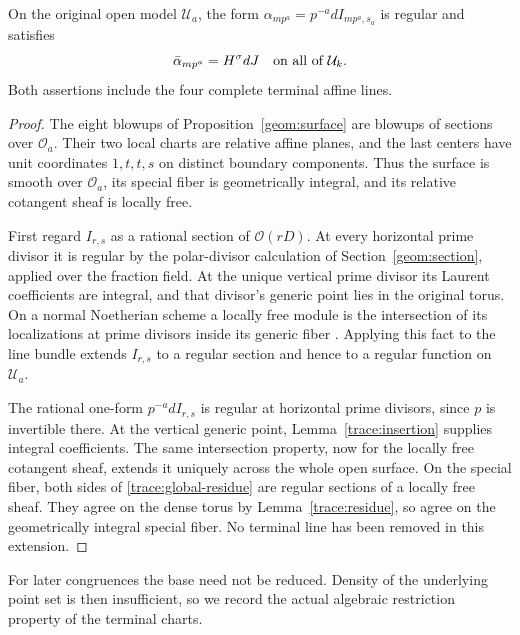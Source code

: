 \begin{proposition}
\label{trace:regular}
On the original open model $\mathcal U_a$, the form
$\alpha_{mp^a}=p^{-a}dI_{mp^a,s_a}$ is regular and satisfies
\begin{equation}
 \bar\alpha_{mp^a}=H^\sigma dJ
 \quad\hbox{on all of }\mathcal U_k.
 \label{trace:global-residue}
\end{equation}
Both assertions include the four complete terminal affine lines.
\end{proposition}

\begin{proof}
The eight blowups of Proposition~\ref{geom:surface} are blowups of sections
over $\mathcal O_a$. Their two local charts are relative affine planes,
and the last centers have unit coordinates $1,t,t,s$ on distinct
boundary components. Thus the surface is smooth over $\mathcal O_a$,
its special fiber is geometrically integral, and its relative cotangent
sheaf is locally free.

First regard $I_{r,s}$ as a rational section of $\mathcal O(rD)$.
At every horizontal prime divisor it is regular by the polar-divisor
calculation of Section~\ref{geom:section}, applied over the fraction field.
At the unique vertical prime divisor its Laurent coefficients are integral,
and that divisor's generic point lies in the original torus.
On a normal Noetherian scheme a locally free module is the intersection
of its localizations at prime divisors inside its generic fiber
\cite[Tag 0AVB]{StacksProject2026}.
Applying this fact to the line bundle extends $I_{r,s}$ to a regular
section and hence to a regular function on $\mathcal U_a$.

The rational one-form $p^{-a}dI_{r,s}$ is regular at horizontal prime
divisors, since $p$ is invertible there. At the vertical generic point,
Lemma~\ref{trace:insertion} supplies integral coefficients. The same
intersection property, now for the locally free cotangent sheaf, extends
it uniquely across the whole open surface. On the special fiber,
both sides of \eqref{trace:global-residue} are regular sections of a
locally free sheaf. They agree on the dense torus by
Lemma~\ref{trace:residue}, so agree on the geometrically integral
special fiber. No terminal line has been removed in this extension.
\end{proof}

For later congruences the base need not be reduced. Density of the
underlying point set is then insufficient, so we record the actual
algebraic restriction property of the terminal charts.

